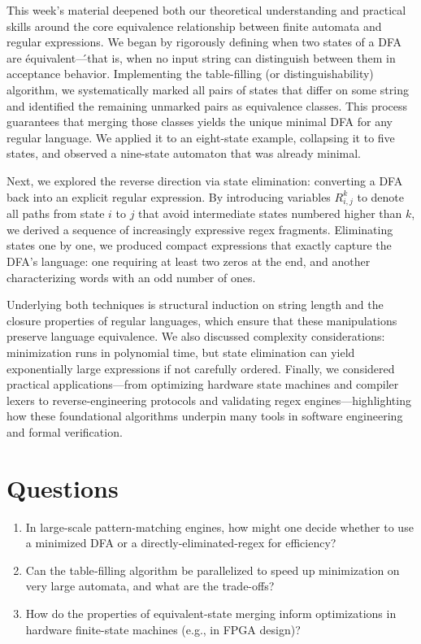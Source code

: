 \documentclass{article}
\begin{document}
  This week’s material deepened both our theoretical understanding and practical skills around the core equivalence relationship between finite automata and regular expressions.  We began by rigorously defining when two states of a DFA are \'equivalent\'—that is, when no input string can distinguish between them in acceptance behavior.  Implementing the table-filling (or distinguishability) algorithm, we systematically marked all pairs of states that differ on some string and identified the remaining unmarked pairs as equivalence classes.  This process guarantees that merging those classes yields the unique minimal DFA for any regular language.  We applied it to an eight-state example, collapsing it to five states, and observed a nine-state automaton that was already minimal.  

Next, we explored the reverse direction via state elimination: converting a DFA back into an explicit regular expression.  By introducing variables $R^k_{i,j}$ to denote all paths from state $i$ to $j$ that avoid intermediate states numbered higher than $k$, we derived a sequence of increasingly expressive regex fragments.  Eliminating states one by one, we produced compact expressions that exactly capture the DFA’s language: one requiring at least two zeros at the end, and another characterizing words with an odd number of ones.  

Underlying both techniques is structural induction on string length and the closure properties of regular languages, which ensure that these manipulations preserve language equivalence.  We also discussed complexity considerations: minimization runs in polynomial time, but state elimination can yield exponentially large expressions if not carefully ordered.  Finally, we considered practical applications—from optimizing hardware state machines and compiler lexers to reverse-engineering protocols and validating regex engines—highlighting how these foundational algorithms underpin many tools in software engineering and formal verification.




\section*{Questions}
\begin{enumerate}
  \item In large-scale pattern-matching engines, how might one decide whether to
        use a minimized DFA or a directly-eliminated-regex for efficiency?  
  \item Can the table‑filling algorithm be parallelized to speed up minimization on
        very large automata, and what are the trade-offs?  
  \item How do the properties of equivalent-state merging inform optimizations in
        hardware finite-state machines (e.g., in FPGA design)?  
\end{enumerate}
\end{document}
